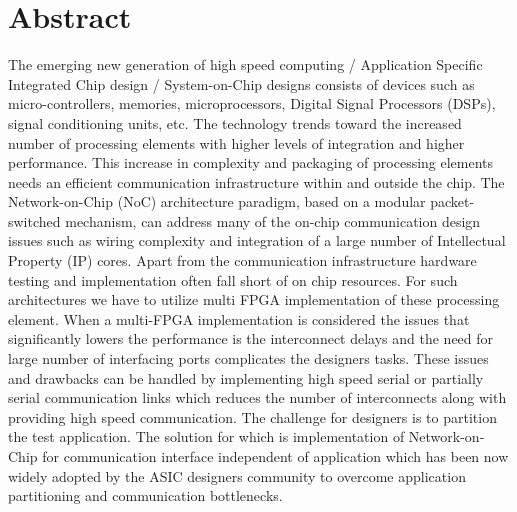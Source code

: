\chapter*{Abstract}
\hspace{5mm}The emerging new generation of high speed computing / Application Specific Integrated Chip design / System-on-Chip designs consists of devices such as micro-controllers, memories, microprocessors, Digital Signal Processors (DSPs), signal conditioning units, etc. The technology trends toward the increased number of processing elements with higher levels of integration and higher performance. This increase in complexity and packaging of processing elements needs an efficient communication infrastructure within and outside the chip. The Network-on-Chip (NoC) architecture paradigm, based on a modular packet-switched mechanism, can address many of the on-chip communication design issues such as wiring complexity and integration of a large number of Intellectual Property (IP) cores. Apart from the communication infrastructure hardware testing and implementation often fall short of on chip resources. For such architectures we have to utilize multi FPGA implementation of these processing element. When a multi-FPGA implementation is considered the issues that significantly lowers the performance is the interconnect delays and the need for large number of interfacing ports complicates the designers tasks. These issues and drawbacks can be handled by implementing high speed serial or partially serial communication links which reduces the number of interconnects along with providing high speed communication. The challenge for designers is to partition the test application. The solution for which is implementation of Network-on-Chip for communication interface independent of application which has been now widely adopted by the ASIC designers community to overcome application partitioning and communication bottlenecks.